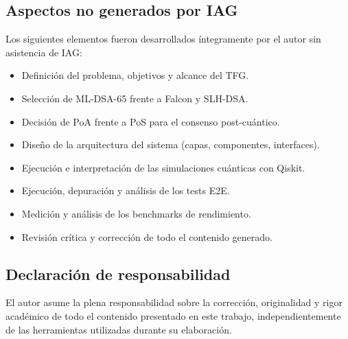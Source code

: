 \subsection*{Aspectos no generados por IAG}

Los siguientes elementos fueron desarrollados íntegramente por el autor sin asistencia de IAG:

\begin{itemize}
  \item Definición del problema, objetivos y alcance del TFG.
  \item Selección de ML-DSA-65 frente a Falcon y SLH-DSA.
  \item Decisión de PoA frente a PoS para el consenso post-cuántico.
  \item Diseño de la arquitectura del sistema (capas, componentes, interfaces).
  \item Ejecución e interpretación de las simulaciones cuánticas con Qiskit.
  \item Ejecución, depuración y análisis de los tests E2E.
  \item Medición y análisis de los benchmarks de rendimiento.
  \item Revisión crítica y corrección de todo el contenido generado.
\end{itemize}

\subsection*{Declaración de responsabilidad}

El autor asume la plena responsabilidad sobre la corrección, originalidad y rigor académico de todo el contenido presentado en este trabajo, independientemente de las herramientas utilizadas durante su elaboración.
